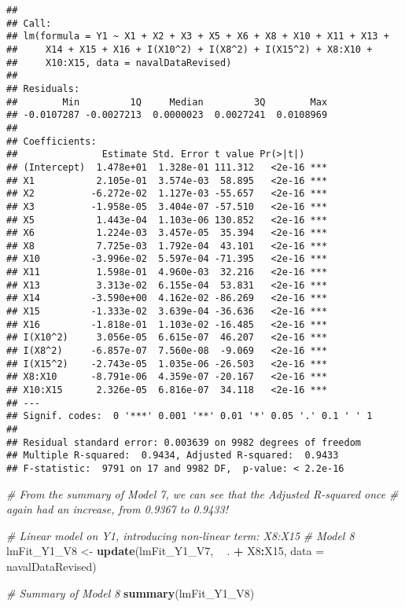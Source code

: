 \documentclass[
]{article}
\newenvironment{Shaded}{\begin{snugshade}}{\end{snugshade}}
\newcommand{\CommentTok}[1]{\textcolor[rgb]{0.56,0.35,0.01}{\textit{#1}}}
\newcommand{\DataTypeTok}[1]{\textcolor[rgb]{0.13,0.29,0.53}{#1}}
\newcommand{\KeywordTok}[1]{\textcolor[rgb]{0.13,0.29,0.53}{\textbf{#1}}}
\newcommand{\NormalTok}[1]{#1}
\newcommand{\OperatorTok}[1]{\textcolor[rgb]{0.81,0.36,0.00}{\textbf{#1}}}
\newcommand{\StringTok}[1]{\textcolor[rgb]{0.31,0.60,0.02}{#1}}
\begin{document}
\begin{verbatim}
## 
## Call:
## lm(formula = Y1 ~ X1 + X2 + X3 + X5 + X6 + X8 + X10 + X11 + X13 + 
##     X14 + X15 + X16 + I(X10^2) + I(X8^2) + I(X15^2) + X8:X10 + 
##     X10:X15, data = navalDataRevised)
## 
## Residuals:
##        Min         1Q     Median         3Q        Max 
## -0.0107287 -0.0027213  0.0000023  0.0027241  0.0108969 
## 
## Coefficients:
##               Estimate Std. Error t value Pr(>|t|)    
## (Intercept)  1.478e+01  1.328e-01 111.312   <2e-16 ***
## X1           2.105e-01  3.574e-03  58.895   <2e-16 ***
## X2          -6.272e-02  1.127e-03 -55.657   <2e-16 ***
## X3          -1.958e-05  3.404e-07 -57.510   <2e-16 ***
## X5           1.443e-04  1.103e-06 130.852   <2e-16 ***
## X6           1.224e-03  3.457e-05  35.394   <2e-16 ***
## X8           7.725e-03  1.792e-04  43.101   <2e-16 ***
## X10         -3.996e-02  5.597e-04 -71.395   <2e-16 ***
## X11          1.598e-01  4.960e-03  32.216   <2e-16 ***
## X13          3.313e-02  6.155e-04  53.831   <2e-16 ***
## X14         -3.590e+00  4.162e-02 -86.269   <2e-16 ***
## X15         -1.333e-02  3.639e-04 -36.636   <2e-16 ***
## X16         -1.818e-01  1.103e-02 -16.485   <2e-16 ***
## I(X10^2)     3.056e-05  6.615e-07  46.207   <2e-16 ***
## I(X8^2)     -6.857e-07  7.560e-08  -9.069   <2e-16 ***
## I(X15^2)    -2.743e-05  1.035e-06 -26.503   <2e-16 ***
## X8:X10      -8.791e-06  4.359e-07 -20.167   <2e-16 ***
## X10:X15      2.326e-05  6.816e-07  34.118   <2e-16 ***
## ---
## Signif. codes:  0 '***' 0.001 '**' 0.01 '*' 0.05 '.' 0.1 ' ' 1
## 
## Residual standard error: 0.003639 on 9982 degrees of freedom
## Multiple R-squared:  0.9434, Adjusted R-squared:  0.9433 
## F-statistic:  9791 on 17 and 9982 DF,  p-value: < 2.2e-16
\end{verbatim}

\begin{Shaded}
\begin{Highlighting}[]
\CommentTok{# From the summary of Model 7, we can see that the Adjusted R-squared once}
\CommentTok{# again had an increase, from 0.9367 to 0.9433!}

\CommentTok{# Linear model on Y1, introducing non-linear term: X8:X15}
\CommentTok{# Model 8}
\NormalTok{lmFit_Y1_V8 <-}\StringTok{ }\KeywordTok{update}\NormalTok{(lmFit_Y1_V7, }\OperatorTok{~}\StringTok{ }\NormalTok{. }\OperatorTok{+}\StringTok{ }\NormalTok{X8}\OperatorTok{:}\NormalTok{X15, }\DataTypeTok{data =}\NormalTok{ navalDataRevised)}

\CommentTok{# Summary of Model 8}
\KeywordTok{summary}\NormalTok{(lmFit_Y1_V8)}
\end{Highlighting}
\end{Shaded}
\end{document}
